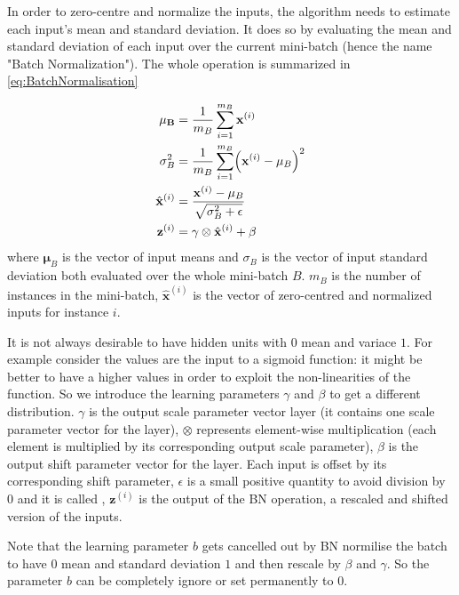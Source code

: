 In order to zero-centre and normalize the inputs, the algorithm needs to estimate each input's mean and standard deviation. It does so by evaluating the mean and standard deviation of each input over the current mini-batch (hence the name "Batch Normalization"). The whole operation is summarized in \autoref{eq:BatchNormalisation}

\begin{equation}
\begin{aligned}
\mathbf{\mu_B} &= \frac{1}{m_B} \sum_{i=1}^{m_B} \x^{(i)} \\
\mathbf{\sigma}_B^2 &= \frac{1}{m_B} \sum_{i=1}^{m_B} \br{\x^{(i)} - \mathbf{\mu}_B}^2\\
\hat{\mathbf{x}}^{(i)} &= \frac{\x^{(i)} - \mathbf{\mu}_B}{\sqrt{\mathbf{\sigma}_B^2 +\epsilon}}\\
\mathbf{z}^{(i)} &= \mathbf{\gamma} \otimes \hat{\mathbf{x}}^{(i)} + \mathbf{\beta}
\end{aligned}
\label{eq:BatchNormalisation}
\end{equation}
where $\mathbf{\mu}_B$ is the vector of input means and $\sigma_B$ is the vector of input standard deviation both evaluated over the whole mini-batch $B$. $m_B$ is the number of instances in the mini-batch, $\hat{\mathbf{x}}^{(i)}$ is the vector of zero-centred and normalized inputs for instance $i$.

It is not always desirable to have hidden units with $0$ mean and variace $1$. For example consider the values are the input to a sigmoid function: it might be better to have a higher values in order to exploit the non-linearities of the function. So we introduce the learning parameters $\gamma$ and $\beta$ to get a different distribution. $\gamma$ is the output scale parameter vector layer (it contains one scale parameter vector for the layer), $\otimes$ represents element-wise multiplication (each element is multiplied by its corresponding output scale parameter), $\beta$ is the output shift parameter vector for the layer. Each input is offset by its corresponding shift parameter, $\epsilon$ is a small positive quantity to avoid division by $0$ and it is called , $\mathbf{z}^{(i)}$ is the output of the BN operation, a rescaled and shifted version of the inputs.

Note that the learning parameter $b$ gets cancelled out by BN normilise the batch to have $0$ mean and standard deviation $1$ and then rescale by $\beta$ and $\gamma$. So the parameter $b$ can be completely ignore or set permanently to $0$.

